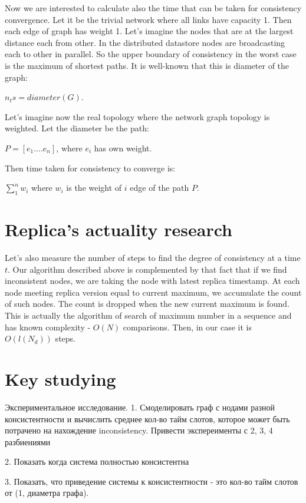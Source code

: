 \documentclass{llncs}
\begin{document}
Now we are interested to calculate also the time that can be taken for consistency convergence.
Let it be the trivial network where all links have capacity 1. Then each edge of graph has weight 1.
Let's imagine the nodes that are at the largest distance each from other. In the distributed datastore nodes are
broadcasting each to other in parallel. So the upper boundary of consistency in the worst case is the maximum of
shortest paths. It is well-known that this is diameter of the graph:


$n_ts = diameter(G)$.


Let's imagine now the real topology where the network graph topology is weighted.
Let the diameter be the path:


$P = [e_1....e_n]$, where $e_i$ has own weight.


Then time taken for consistency to converge is:

$\sum_1^{n}w_i$ where $w_i$ is the weight of $i$ edge of the path $P$.


\section{Replica's actuality research}

Let's also measure the number of steps to find the degree of consistency at a time $t$.
Our algorithm described above is complemented by that fact that if we find inconsistent nodes,
we are taking the node with latest replica timestamp. At each node meeting replica version equal to current maximum, we accumulate the count of such nodes. The count is dropped when the new current maximum is found. This is actually the algorithm of search of maximum number in a sequence and has known complexity - $O(N)$ comparisons.
Then, in our case it is $O(l(N_d))$ steps.



\section{Key studying}\label{sec:experiments}

Экспериментальное исследование.
1. Смоделировать граф с нодами разной консистентности и вычислить среднее кол-во тайм слотов, которое может быть потрачено на нахождение inconsistency.
Привести экспереименты с 2, 3, 4 разбиениями

2. Показать когда система полностью консистентна

3. Показать, что приведение системы к консистентности - это кол-во тайм слотов от (1, диаметра графа).
\end{document}
